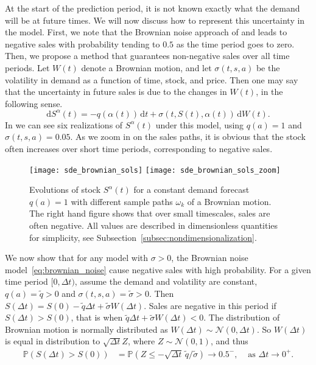 \documentclass[main.tex]{subfiles}
\begin{document}
At the start of the prediction period, it is not known exactly what
the demand will be at future times. We will now discuss how to
represent this uncertainty in the model. First, we note that the Brownian noise
approach of \citet{raman1995optimal} and \citet{wu2016dynamic} leads to negative
sales with probability tending to $0.5$ as the time period goes to zero.
Then, we propose a method that guarantees non-negative sales over all
time periods.
Let $W(t)$ denote a Brownian motion, and let $\sigma(t,s,a)$ be the volatility
in demand as a function of time, stock, and price. Then
one may say that the uncertainty in future
sales is due to the changes in $W(t)$, in the following sense.
\begin{equation}\label{eq:brownian_noise}
  \mathrm{d}S^\alpha(t) = -q(\alpha(t))\,\mathrm{d}t + \sigma(t,S(t),\alpha(t))\,\mathrm{d}W(t).
\end{equation}
In  we can see six realizations of
$S^\alpha(t)$ under
this model, using $q(a)=1$ and $\sigma(t,s,a)=0.05$. As we zoom in on
the sales paths, it is obvious that the stock often
increases over short time periods, corresponding to negative sales.
\begin{figure}[htbp]
  \centering
  \texttt{[image: sde\_brownian\_sols]}%
  \texttt{[image: sde\_brownian\_sols\_zoom]}
  \caption{Evolutions of stock $S^\alpha(t)$ for a constant
    demand forecast $q(a)=1$ with different sample paths $\omega_k$
    of a Brownian motion.
    The right hand figure shows that over small timescales, sales are
    often negative.
    All values are described in dimensionless quantities for
    simplicity, see Subsection~\ref{subsec:nondimensionalization}.
  }\label{fig:brownian_paths}
\end{figure}
We now show that for any model with $\sigma>0$, the Brownian noise
model~\eqref{eq:brownian_noise} cause negative sales with high
probability.
For a given time period $[0,\Delta t)$, assume the demand and volatility are constant,
$q(a)=\tilde q>0$ and $\sigma(t,s,a)=\tilde \sigma>0$.
Then $S(\Delta t)=S(0)-\tilde q\Delta t + \tilde \sigma W(\Delta t)$.
Sales are negative in this period if $S(\Delta t)>S(0)$, that is when
$\tilde q\Delta t+\tilde \sigma W(\Delta t) < 0$.
The distribution of Brownian motion is normally distributed as
$W(\Delta t)\sim \mathcal N(0,\Delta t)$. So $W(\Delta t)$ is equal in
distribution to $\sqrt{\Delta t}Z$, where $Z\sim \mathcal N(0,1)$, and thus
\begin{align}
  \mathbb P(S(\Delta t)>S(0))
  &=\mathbb P(Z\leq -\sqrt{\Delta t}\,\tilde q / \tilde \sigma)
    \to 0.5^-,& \text{ as } \Delta t \to 0^+.
\end{align}
\end{document}
